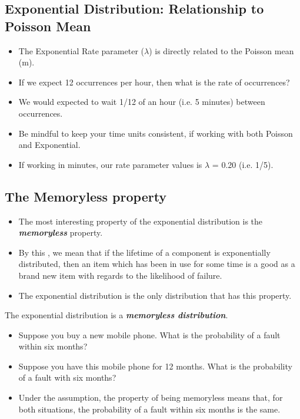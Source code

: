 \documentclass[a4paper,12pt]{article}
\begin{document}
\subsection*{Exponential Distribution: Relationship to Poisson Mean}
\begin{itemize}
\item The Exponential Rate parameter ($\lambda$) is directly related to the Poisson mean (m).
\item If we expect 12 occurrences per hour, then what is the rate of occurrences?
\item We would expected to wait 1/12 of an hour (i.e. 5 minutes) between occurrences.
\item Be mindful to keep your time units consistent, if working with both Poisson and Exponential.
\item If working in minutes, our rate parameter values is $\lambda$ = 0.20 (i.e. 1/5).
\end{itemize}









\subsection*{The Memoryless property}
\begin{itemize}
\item The most interesting property of the exponential distribution is the \textbf{\emph{memoryless}} property. 
\item By this , we mean that if  the lifetime of a component is exponentially distributed, then an item which has been in use for some time is a good as a brand new item with regards to the likelihood of failure.
\item 
The exponential distribution is the only distribution that has this property.
\end{itemize}

The exponential distribution is a \textbf{\textit{memoryless distribution}}.

\begin{itemize}
\item Suppose you buy a new mobile phone. What is the probability of a fault within six months?

\item Suppose you have this mobile phone for 12 months. What is the probability of a fault with six months?

\item Under the assumption, the property of being memoryless means that, for both situations, the probability of a fault within six months is the same.

\end{itemize}
\end{document}
